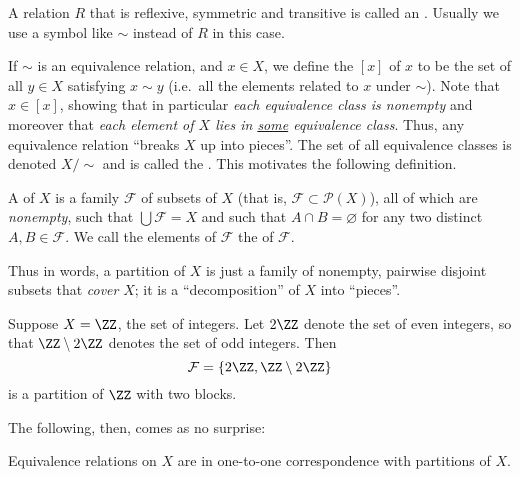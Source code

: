 \begin{definition}
A relation $R$ that is reflexive, symmetric and transitive is called an . Usually we use a symbol like $\sim$ instead of $R$ in this case.
\end{definition}

If $\sim$ is an equivalence relation, and $x \in X$, we define the  $[x]$ of $x$ to be the set of all $y \in X$ satisfying $x \sim y$ (i.e.\ all the elements related to $x$ under $\sim$). Note that $x \in [x]$, showing that in particular \emph{each equivalence class is nonempty} and moreover that \emph{each element of $X$ lies in \ul{some} equivalence class}. Thus, any equivalence relation ``breaks $X$ up into pieces''. The set of all equivalence classes is denoted $X/{\sim}$ and is called the . This motivates the following definition.

\begin{definition}
A  of $X$ is a family $\mathcal{F}$ of subsets of $X$ (that is, $\mathcal{F} \subset \mathcal{P}(X)$), all of which are \emph{nonempty}, such that $\bigcup \mathcal{F} = X$ and such that $A \cap B = \varnothing$ for any two distinct $A,B \in \mathcal{F}$. We call the elements of $\mathcal{F}$ the  of $\mathcal{F}$.
\end{definition}

Thus in words, a partition of $X$ is just a family of nonempty, pairwise disjoint subsets that \emph{cover} $X$; it is a ``decomposition'' of $X$ into ``pieces''.

\begin{example}
Suppose $X=\ZZ$, the set of integers. Let $2\ZZ$ denote the set of even integers, so that $\ZZ \setminus 2\ZZ$ denotes the set of odd integers. Then
\[ \mathcal{F} = \{ 2\ZZ, \ZZ \setminus 2 \ZZ \} \]
is a partition of $\ZZ$ with two blocks.
\end{example}

The following, then, comes as no surprise:

\begin{proposition}
Equivalence relations on $X$ are in one-to-one correspondence with partitions of $X$.
\end{proposition}

